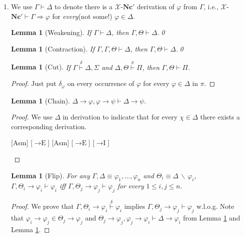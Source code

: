 \documentclass[12pt]{article}
\newcommand\A{\varphi}
\newcommand\B{\psi}
\newcommand\CC{\chi}
\newcommand\GG\Gamma
\newcommand\D\Delta
\newcommand\T\Theta
\newcommand\SM\Sigma
\newcommand\PP\Pi
\newcommand\TO\Rightarrow
\newcommand\PC[1]{\mathbf{#1}}
\newcommand\II{\textrm{$\to$I}}
\newcommand\IE{\textrm{$\to$E}}
\newcommand{\asm}[1]{\delims{[}{]^{#1}}}
\newcounter{thm}
\newtheorem{lemma}[thm]{Lemma}
\begin{document}
\begin{enumerate}
\begin{enumerate}
        \item
            We use $\GG\vdash\D$ to denote there is a $\mathcal{X}$-$\PC{Nc}'$ derivation of $\A$ from $\GG$, i.e., $\mathcal{X}$-$\PC{Nc}'\vdash\GG\TO\A$ for \emph{every}(not some!) $\A\in\D$.
            \begin{lemma}[Weakening]\label{NW}
            If $\GG\vdash\D$, then $\GG,\T\vdash\D$.\qed
            \end{lemma}
            \begin{lemma}[Contraction]\label{NC}
            If $\GG,\GG,\T\vdash\D$, then $\GG,\T\vdash\D$.\qed
            \end{lemma}
            \begin{lemma}[Cut]\label{NCut}
            If $\GG\overset{\delta}{\vdash}\D,\SM$ and $\D,\T\overset{\pi}{\vdash}\PP$, then $\GG,\T\vdash\PP$.
            \end{lemma}
            \begin{proof}
                Just put $\delta_\A$ on every occurrence of $\A$ for every $\A\in\D$ in $\pi$.
            \end{proof}
            \begin{lemma}[Chain]\label{NChain}
                $\D\to\A,\A\to\B\vdash\D\to\B$.
            \end{lemma}
            \begin{proof}
                We use $\D$ in derivation to indicate that for every $\CC\in\D$ there exists a corresponding derivation.
                \begin{prooftree*}
                \hypo{\D}
                \asm{u}
                [Asm]{\D\to\A}
                [$\IE$]{\A}
                [Asm]{\A\to\B}
                [$\IE$]{\B}
                [$\II$]{\D\to\B}
                \end{prooftree*}
            \end{proof}
            \begin{lemma}[Flip]
                For any $\GG,\D\equiv\A_1,\ldots,\A_n$ and $\T_i\equiv\D\,\backslash\,\A_i$, $\GG,\T_i\to\A_i\vdash\A_i$ iff $\GG,\T_j\to\A_j\vdash\A_j$ for every $1\le i,j\le n$.
            \end{lemma}
            \begin{proof}
            We prove that $\GG,\T_i\to\A_i\overset{\delta}{\vdash}\A_i$ implies $\GG,\T_j\to\A_j\vdash\A_j$ w.l.o.g. Note that $\A_i\to\A_j\in\T_j\to\A_j$ and $\T_j\to\A_j,\A_j\to\A_i\vdash\D\to\A_i$ from Lemma \ref{NChain} and Lemma \ref{NW}.
            

\end{proof}
\end{enumerate}
\end{enumerate}
\end{document}
